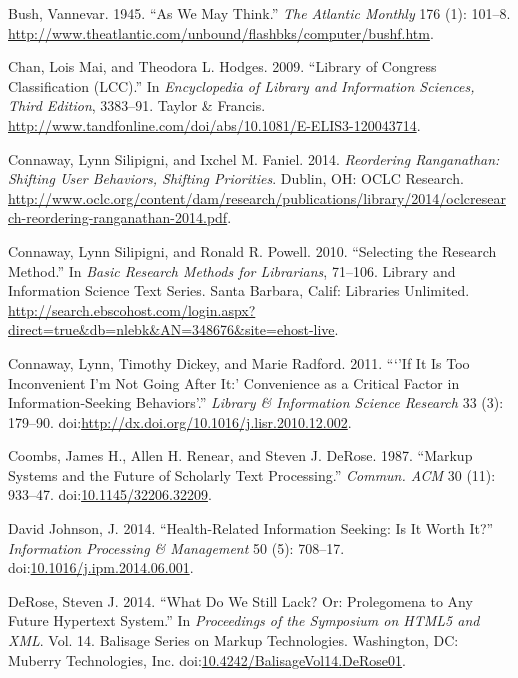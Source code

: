 \documentclass[]{article}
\begin{document}
\hypertarget{ref-bushux5fasux5f1945}{}
Bush, Vannevar. 1945. ``As We May Think.'' \emph{The Atlantic Monthly}
176 (1): 101--8.
\url{http://www.theatlantic.com/unbound/flashbks/computer/bushf.htm}.

\hypertarget{ref-chanux5flibraryux5f2009}{}
Chan, Lois Mai, and Theodora L. Hodges. 2009. ``Library of Congress
Classification (LCC).'' In \emph{Encyclopedia of Library and Information
Sciences, Third Edition}, 3383--91. Taylor \& Francis.
\url{http://www.tandfonline.com/doi/abs/10.1081/E-ELIS3-120043714}.

\hypertarget{ref-connawayux5freorderingux5f2014}{}
Connaway, Lynn Silipigni, and Ixchel M. Faniel. 2014. \emph{Reordering
Ranganathan: Shifting User Behaviors, Shifting Priorities}. Dublin, OH:
OCLC Research.
\url{http://www.oclc.org/content/dam/research/publications/library/2014/oclcresearch-reordering-ranganathan-2014.pdf}.

\hypertarget{ref-connawayux5fselectingux5f2010}{}
Connaway, Lynn Silipigni, and Ronald R. Powell. 2010. ``Selecting the
Research Method.'' In \emph{Basic Research Methods for Librarians},
71--106. Library and Information Science Text Series. Santa Barbara,
Calif: Libraries Unlimited.
\url{http://search.ebscohost.com/login.aspx?direct=true\&db=nlebk\&AN=348676\&site=ehost-live}.

\hypertarget{ref-connawayux5fifux5f2011}{}
Connaway, Lynn, Timothy Dickey, and Marie Radford. 2011. ```'If It Is
Too Inconvenient I'm Not Going After It:' Convenience as a Critical
Factor in Information-Seeking Behaviors'.'' \emph{Library \& Information
Science Research} 33 (3): 179--90.
doi:\href{https://doi.org/http://dx.doi.org/10.1016/j.lisr.2010.12.002}{http://dx.doi.org/10.1016/j.lisr.2010.12.002}.

\hypertarget{ref-coombsux5fmarkupux5f1987}{}
Coombs, James H., Allen H. Renear, and Steven J. DeRose. 1987. ``Markup
Systems and the Future of Scholarly Text Processing.'' \emph{Commun.
ACM} 30 (11): 933--47.
doi:\href{https://doi.org/10.1145/32206.32209}{10.1145/32206.32209}.

\hypertarget{ref-davidux5fjohnsonux5fhealth-relatedux5f2014}{}
David Johnson, J. 2014. ``Health-Related Information Seeking: Is It
Worth It?'' \emph{Information Processing \& Management} 50 (5): 708--17.
doi:\href{https://doi.org/10.1016/j.ipm.2014.06.001}{10.1016/j.ipm.2014.06.001}.

\hypertarget{ref-deroseux5fwhatux5f2014}{}
DeRose, Steven J. 2014. ``What Do We Still Lack? Or: Prolegomena to Any
Future Hypertext System.'' In \emph{Proceedings of the Symposium on
HTML5 and XML}. Vol. 14. Balisage Series on Markup Technologies.
Washington, DC: Muberry Technologies, Inc.
doi:\href{https://doi.org/10.4242/BalisageVol14.DeRose01}{10.4242/BalisageVol14.DeRose01}.
\end{document}

